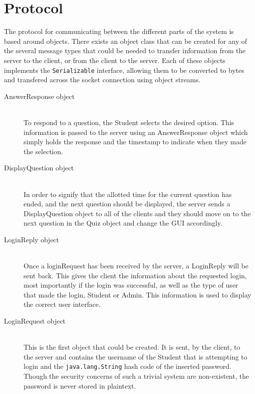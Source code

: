 \section{Protocol}
\label{sec:protocol}

The protocol for communicating between the different parts of the system is
based around objects. There exists an object class that can be created for any
of the several message types that could be needed to transfer information from
the server to the client, or from the client to the server. Each of these
objects implements the \texttt{Serializable} interface, allowing them to be
converted to bytes and transfered across the socket connection using object
streams.

\begin{description}
	\item[AnswerResponse object] \hfill \\ To respond to a question, the
		Student selects the desired option. This information is passed to the
		server using an AnswerResponse object which simply holds the response
		and the timestamp to indicate when they made the selection.

	\item[DisplayQuestion object]\hfill \\ In order to signify that the
		allotted time for the current question has ended, and the next question
		should be displayed, the server sends a DisplayQuestion object to all
		of the clients and they should move on to the next question in the Quiz
		object and change the GUI accordingly.

	\item[LoginReply object]\hfill \\ Once a loginRequest has been received by
		the server, a LoginReply will be sent back. This gives the client the
		information about the requested login, most importantly if the login
		was successful, as well as the type of user that made the login,
		Student or Admin. This information is used to display the correct user
		interface.

	\item[LoginRequest object]\hfill \\ This is the first object that could be
		created.  It is sent, by the client, to the server and contains the
		username of the Student that is attempting to login and the
		\texttt{java.lang.String} hash code of the inserted password. Though
		the security concerns of such a trivial system are non-existent, the
		password is never stored in plaintext.


\end{description}
